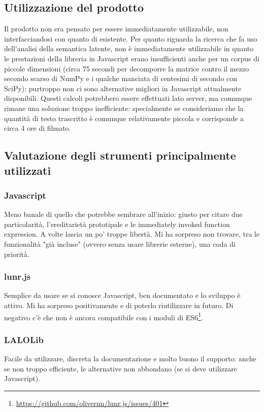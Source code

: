 \subsection{Utilizzazione del prodotto}
Il prodotto non era pensato per essere immediatamente utilizzabile, non interfacciandosi con quanto di esistente.
Per quanto riguarda la ricerca che fa uso dell'analisi della semantica latente, non è immediatamente utilizzabile in quanto le prestazioni della libreria in Javascript erano insufficienti anche per un \gls{corpus} di piccole dimensioni (circa 75 secondi per decomporre la matrice contro il mezzo secondo scarso di NumPy e i qualche manciata di centesimi di secondo con SciPy): purtroppo non ci sono alternative migliori in Javascript attualmente disponibili. 
Questi calcoli potrebbero essere effettuati lato server, ma comunque rimane una soluzione troppo inefficiente: specialmente se consideriamo che la quantità di testo trascritto è comunque relativamente piccola e corrisponde a circa 4 ore di filmato.

\subsection{Valutazione degli strumenti principalmente utilizzati}
\subsubsection{Javascript}
Meno banale di quello che potrebbe sembrare all'inizio: giusto per citare due particolarità, l'ereditarietà prototipale e le immediately invoked function expression. A volte lascia un po' troppe libertà. Mi ha sorpreso non trovare, tra le funzionalità "già incluse" (ovvero senza usare librerie esterne), una coda di priorità.

\subsubsection{lunr.js}
Semplice da usare se si conosce Javascript, ben documentato e lo sviluppo è attivo. Mi ha sorpreso positivamente e di poterlo riutilizzare in futuro. Di negativo c'è che non è ancora compatibile con i moduli di ES6\footnote{\url{https://github.com/olivernn/lunr.js/issues/401}}. 

\subsubsection{LALOLib}
Facile da utilizzare, discreta la documentazione e molto buono il supporto: anche se non troppo efficiente, le alternative non abbondano (se si deve utilizzare Javascript).     
